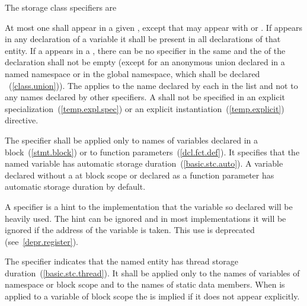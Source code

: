 \pnum
The storage class specifiers are

\begin{bnf}
\br
    \br
    \br
    \br
    \br
\end{bnf}

At most one  shall appear in a given
, except that  may appear with  or 
. If  appears in any declaration of
a variable it shall be present in all declarations of that entity. If a 
appears in a , there can be no
 specifier in the same  and
the  of the declaration shall not be
empty (except for an anonymous union declared in a named namespace or in the
global namespace, which shall be declared
%
~(\ref{class.union})). The
 applies to the name declared by each
 in the list and not to any names declared by
other specifiers. A  shall not be
specified in an explicit specialization~(\ref{temp.expl.spec}) or an
explicit instantiation~(\ref{temp.explicit}) directive.

\pnum
{}%
The  specifier shall be applied only to names of variables
declared in a block~(\ref{stmt.block}) or to function
parameters~(\ref{dcl.fct.def}). It specifies that the named variable has
automatic storage duration~(\ref{basic.stc.auto}). A variable declared
without a  at block scope or declared
as a function parameter has automatic storage duration by default.

\pnum
{}%
A  specifier is a hint to the implementation that the
variable so declared will be heavily used.
\enternote
The hint can be ignored and in most implementations it will be ignored
if the address of the variable is taken. This use is deprecated (see~\ref{depr.register}).
\exitnote

\pnum
The  specifier
indicates that the named entity has thread storage duration~(\ref{basic.stc.thread}). It
shall be applied only
to the names of variables of namespace
or block scope and to the names of static data members.
When  is applied to a variable of block scope the
  is implied if it does not
appear explicitly.

